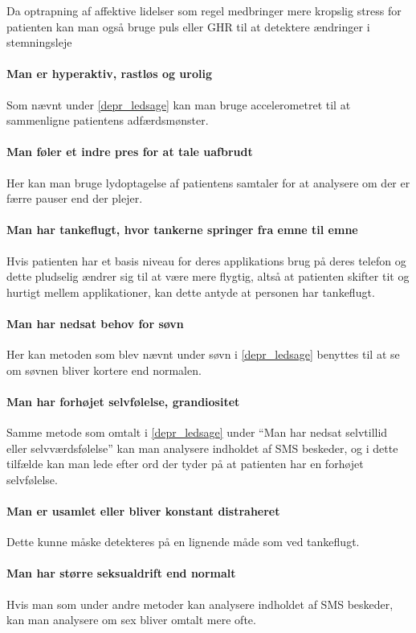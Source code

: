 Da optrapning af affektive lidelser som regel medbringer mere kropslig stress for patienten kan man også bruge puls eller GHR til at detektere ændringer i stemningsleje \citep{misc:jorgen-aagaard}

\paragraph{Man er hyperaktiv, rastløs og urolig}
Som nævnt under \cref{depr_ledsage} kan man bruge accelerometret til at sammenligne patientens adfærdsmønster.

\paragraph{Man føler et indre pres for at tale uafbrudt}
Her kan man bruge lydoptagelse af patientens samtaler for at analysere om der er færre pauser end der plejer.

\paragraph{Man har tankeflugt, hvor tankerne springer fra emne til emne}
Hvis patienten har et basis niveau for deres applikations brug på deres telefon og dette pludselig ændrer sig til at være mere flygtig, altså at patienten skifter tit og hurtigt mellem applikationer, kan dette antyde at personen har tankeflugt.  

\paragraph{Man har nedsat behov for søvn}
Her kan metoden som blev nævnt under søvn i \cref{depr_ledsage} benyttes til at se om søvnen bliver kortere end normalen.

\paragraph{Man har forhøjet selvfølelse, grandiositet}
Samme metode som omtalt i \cref{depr_ledsage} under ``Man har nedsat selvtillid eller selvværdsfølelse'' kan man analysere indholdet af SMS beskeder, og i dette tilfælde kan man lede efter ord der tyder på at patienten har en forhøjet selvfølelse.

\paragraph{Man er usamlet eller bliver konstant distraheret}
Dette kunne måske detekteres på en lignende måde som ved tankeflugt.

\paragraph{Man har større seksualdrift end normalt}
Hvis man som under andre metoder kan analysere indholdet af SMS beskeder, kan man analysere om sex bliver omtalt mere ofte.



